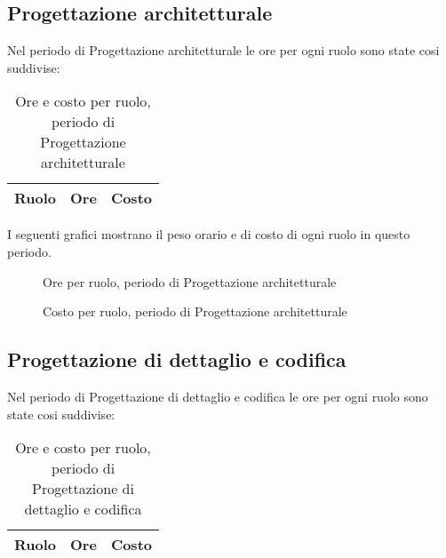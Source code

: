 \subsection{Progettazione architetturale}

Nel periodo di Progettazione architetturale le ore per ogni ruolo sono state cosi suddivise:

\begin{table}[H]
	\centering
	\begin{tabular}{ l c c }
	\textbf{Ruolo} & \textbf{Ore} & \textbf{Costo} \\
	\hline
	
		
	
	\end{tabular}
	\caption{Ore e costo per ruolo, periodo di Progettazione architetturale}
	\end{table}
	
I seguenti grafici mostrano il peso orario e di costo di ogni ruolo in questo periodo.

\begin{figure}[H]
\begin{tikzpicture}

	

\end{tikzpicture}
\caption{Ore per ruolo, periodo di Progettazione architetturale}
\end{figure}

\begin{figure}[H]
\begin{tikzpicture}

	

\end{tikzpicture}
\caption{Costo per ruolo, periodo di Progettazione architetturale}
\end{figure}

\subsection{Progettazione di dettaglio e codifica}

Nel periodo di Progettazione di dettaglio e codifica le ore per ogni ruolo sono state cosi suddivise:

\begin{table}[H]
	\centering
	\begin{tabular}{ l c c }
	\textbf{Ruolo} & \textbf{Ore} & \textbf{Costo} \\
	\hline
	
		
	
	\end{tabular}
	\caption{Ore e costo per ruolo, periodo di Progettazione di dettaglio e codifica}
	\end{table}


